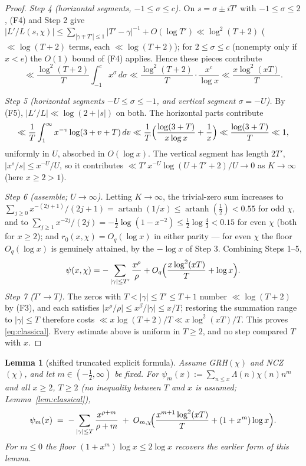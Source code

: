\documentclass[11pt]{article}
\newtheorem{lemma}{Lemma}
\begin{document}
\begin{proof}
\emph{Step 4 (horizontal segments, $-1\le\sigma\le c$).} On
$s=\sigma\pm iT'$ with $-1\le\sigma\le2$, (F4) and Step 2 give
$|L'/L(s,\chi)|\le\sum_{|\gamma\mp T'|\le1}|T'-\gamma|^{-1}
+O(\log T')\ll\log^2(T+2)$ ($\ll\log(T+2)$ terms, each
$\ll\log(T+2)$); for $2\le\sigma\le c$ (nonempty only if $x<e$) the
$O(1)$ bound of (F4) applies. Hence these pieces contribute
\[
\ll\frac{\log^2(T+2)}{T}\int_{-1}^{c}x^\sigma\,d\sigma
\ll\frac{\log^2(T+2)}{T}\cdot\frac{x^c}{\log x}
\ll\frac{x\log^2(xT)}{T}.
\]

\emph{Step 5 (horizontal segments $-U\le\sigma\le-1$, and vertical
segment $\sigma=-U$).} By (F5), $|L'/L|\ll\log(2+|s|)$ on both. The
horizontal parts contribute
\[
\ll\frac1T\int_{1}^{\infty}x^{-v}\log(3+v+T)\,dv
\ll\frac1T\Bigl(\frac{\log(3+T)}{x\log x}+\frac1x\Bigr)
\ll\frac{\log(3+T)}{T}\ll1,
\]
uniformly in $U$, absorbed in $O(\log x)$. The vertical segment has
length $2T'$, $|x^s/s|\le x^{-U}/U$, so it contributes
$\ll T'\,x^{-U}\log(U+T'+2)/U\to0$ as $K\to\infty$ (here $x\ge2>1$).

\emph{Step 6 (assemble; $U\to\infty$).} Letting $K\to\infty$, the
trivial-zero sum increases to
$\sum_{j\ge0}x^{-(2j+1)}/(2j+1)=\operatorname{artanh}(1/x)
\le\operatorname{artanh}(\tfrac12)<0.55$ for odd $\chi$, and to
$\sum_{j\ge1}x^{-2j}/(2j)=-\tfrac12\log(1-x^{-2})
\le\tfrac12\log\tfrac43<0.15$ for even $\chi$ (both for $x\ge2$);
and $r_0(x,\chi)=O_q(\log x)$ in either parity --- for even $\chi$
the floor $O_q(\log x)$ is genuinely attained, by the $-\log x$ of
Step 3. Combining Steps 1--5,
\[
\psi(x,\chi)=-\sum_{|\gamma|\le T'}\frac{x^\rho}{\rho}
+O_q\Bigl(\frac{x\log^2(xT)}{T}+\log x\Bigr).
\]
\emph{Step 7 ($T'\to T$).} The zeros with $T<|\gamma|\le T'\le T+1$
number $\ll\log(T+2)$ by (F3), and each satisfies
$|x^\rho/\rho|\le x^{\beta}/|\gamma|\le x/T$; restoring the summation
range to $|\gamma|\le T$ therefore costs $\ll x\log(T+2)/T\ll
x\log^2(xT)/T$. This proves \eqref{eq:classical}. Every estimate above
is uniform in $T\ge2$, and no step compared $T$ with $x$.
\end{proof}


\begin{lemma}[shifted truncated explicit formula]\label{lem:trunc}
Assume GRH$(\chi)$ and NCZ$(\chi)$, and let $m\in(-\tfrac12,\infty)$
be fixed. For
$\psi_m(x):=\sum_{n\le x}\Lambda(n)\chi(n)n^m$ and all $x\ge2$,
$T\ge2$ (no inequality between $T$ and $x$ is assumed;
Lemma~\ref{lem:classical}),
\begin{equation}\label{eq:trunc}
\psi_m(x)\;=\;-\sum_{|\gamma|\le T}\frac{x^{\rho+m}}{\rho+m}
\;+\;O_{m,\chi}\!\Bigl(\frac{x^{m+1}\log^2(xT)}{T}+(1+x^m)\log x\Bigr).
\end{equation}
For $m\le0$ the floor $(1+x^m)\log x\le2\log x$ recovers the earlier
form of this lemma.
\end{lemma}
\end{document}
